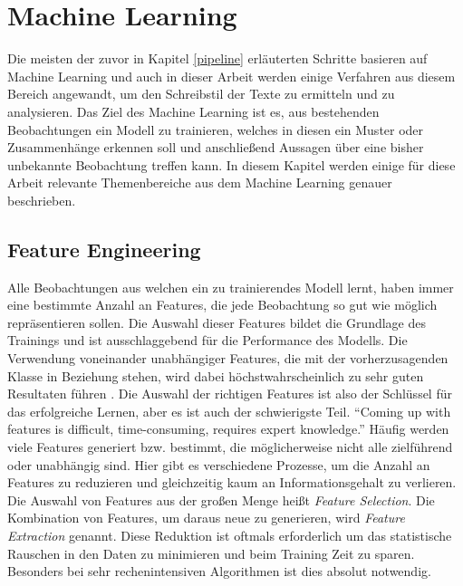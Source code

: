\section{Machine Learning}
Die meisten der zuvor in Kapitel \ref{pipeline} erläuterten Schritte basieren auf Machine Learning und auch in dieser Arbeit werden einige Verfahren aus diesem Bereich angewandt, um den Schreibstil der Texte zu ermitteln und zu analysieren. Das Ziel des Machine Learning ist es, aus bestehenden Beobachtungen ein Modell zu trainieren, welches in diesen ein Muster oder Zusammenhänge erkennen soll und anschließend Aussagen über eine bisher unbekannte Beobachtung treffen kann. In diesem Kapitel werden einige für diese Arbeit relevante Themenbereiche aus dem Machine Learning genauer beschrieben.

\subsection{Feature Engineering}
Alle Beobachtungen aus welchen ein zu trainierendes Modell lernt, haben immer eine bestimmte Anzahl an Features, die jede Beobachtung so gut wie möglich repräsentieren sollen. Die Auswahl dieser Features bildet die Grundlage des Trainings und ist ausschlaggebend für die Performance des Modells. Die Verwendung voneinander unabhängiger Features, die mit der vorherzusagenden Klasse in Beziehung stehen, wird dabei höchstwahrscheinlich zu sehr guten Resultaten führen \cite{domingos2012few}. Die Auswahl der richtigen Features ist also der Schlüssel für das erfolgreiche Lernen, aber es ist auch der schwierigste Teil. "`Coming up with features is difficult, time-consuming, requires expert knowledge."' \cite{ng2013machine} Häufig werden viele Features generiert bzw. bestimmt, die möglicherweise nicht alle zielführend oder unabhängig sind. Hier gibt es verschiedene Prozesse, um die Anzahl an Features zu reduzieren und gleichzeitig kaum an Informationsgehalt zu verlieren. Die Auswahl von Features aus der großen Menge heißt \emph{Feature Selection}. Die Kombination von Features, um daraus neue zu generieren, wird \emph{Feature Extraction} genannt. Diese Reduktion ist oftmals erforderlich um das statistische Rauschen in den Daten zu minimieren und beim Training Zeit zu sparen. Besonders bei sehr rechenintensiven Algorithmen ist dies absolut notwendig.

